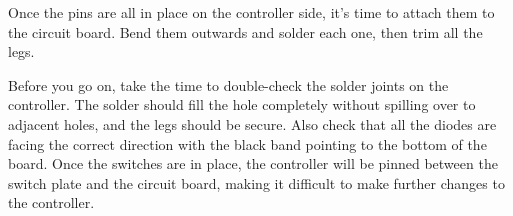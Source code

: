 \documentclass{article}
\begin{document}
\vspace{1em}
\noindent{}
\vspace{1em}

Once the pins are all in place on the controller side, it's time to
attach them to the circuit board. Bend them outwards and solder each
one, then trim all the legs.

\vspace{1em}
\noindent{}
\vspace{1em}

Before you go on, take the time to double-check the solder joints on
the controller. The solder should fill the hole completely without
spilling over to adjacent holes, and the legs should be secure. Also
check that all the diodes are facing the correct direction with the
black band pointing to the bottom of the board. Once the switches are
in place, the controller will be pinned between the switch plate and
the circuit board, making it difficult to make further changes to the
controller.
\end{document}
